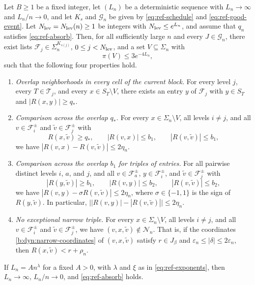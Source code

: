 \begin{lemma}
\label{lem:ref-families}
Let $B\ge1$ be a fixed integer, let $(L_n)$ be a deterministic sequence with
$L_n\to\infty$ and $L_n/n\to0$, and let $K_s$ and $\mathcal G_n$ be given by
\eqref{eq:ref-schedule} and \eqref{eq:ref-good-event}. Let
$N_{\rm lev}=N_{\rm lev}(n)\ge1$ be integers with
$N_{\rm lev}\le e^{L_n}$, and assume that $q_n$ satisfies
\eqref{eq:ref-absorb}. Then, for all sufficiently large $n$ and every
$J\in\mathcal G_n$, there exist lists
$\mathcal F_j\in\Sigma_n^{K_{s(j)}}$, $0\le j<N_{\rm lev}$, and a set
$V\subseteq\Sigma_n$ with
\begin{equation}\label{b:dyn:fixed-bank}
 \pi(V)\le3e^{-4L_n},
\end{equation}
such that the following four properties hold.
\begin{enumerate}[label=\textup{(\roman*)}]
\item \emph{Overlap neighborhoods in every cell of the current block.} For
every level $j$,
every $T\in\mathcal T_j$, and every $x\in S_T\setminus V$, there exists an
entry $y$ of $\mathcal F_j$ with $y\in S_T$ and $|R(x,y)|\ge q_*$.
\item \emph{Comparison across the overlap $q_*$.} For every
$x\in\Sigma_n\setminus V$, all levels $i\ne j$, and all
$v\in\mathcal F_i^\pm$ and ${\widetilde v}\in\mathcal F_j^\pm$ with
\[
 R(x,{\widetilde v})\ge q_*,\qquad |R(v,x)|\le b_1,\qquad |R(v,{\widetilde v})|\le b_1,
\]
we have $|R(v,x)-R(v,{\widetilde v})|\le2\eta_n$.
\item \emph{Comparison across the overlap $b_1$ for triples of entries.}
For all pairwise distinct levels $i$, $a$, and $j$, and all
$v\in\mathcal F_a^\pm$, $y\in\mathcal F_i^\pm$, and ${\widetilde v}\in\mathcal F_j^\pm$
with
\[
 |R(y,{\widetilde v})|\ge b_1,\qquad |R(v,y)|\le b_2,\qquad |R(v,{\widetilde v})|\le b_2,
\]
we have $|R(v,y)-\sigma R(v,{\widetilde v})|\le2\eta_n$, where $\sigma\in\{-1,1\}$ is the
sign of $R(y,{\widetilde v})$. In particular,
$\bigl||R(v,y)|-|R(v,{\widetilde v})|\bigr|\le2\eta_n$.
\item \emph{No exceptional narrow triple.} For every
$x\in\Sigma_n\setminus V$, all levels $i\ne j$, and all
$v\in\mathcal F_i^\pm$ and ${\widetilde v}\in\mathcal F_j^\pm$, we have
$(v,x,{\widetilde v})\notin\mathcal N_n$. That is, if the coordinates
\eqref{b:dyn:narrow-coordinates} of $(v,x,{\widetilde v})$ satisfy $r\in J_\beta$ and
$\varepsilon_n\le|\delta|\le2\varepsilon_n$, then $R(x,{\widetilde v})<r+\rho_n$.
\end{enumerate}
If $L_n=An^\lambda$ for a fixed $A>0$, with $\lambda$ and $\xi$ as in
\eqref{eq:ref-exponents}, then $L_n\to\infty$, $L_n/n\to0$, and
\eqref{eq:ref-absorb} holds.
\end{lemma}

